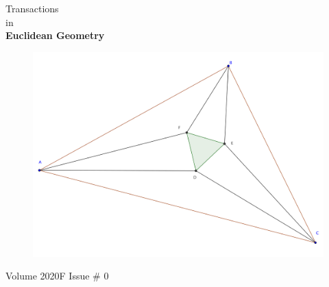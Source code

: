 \documentclass{report}
\begin{document}
\thispagestyle{empty}
\begin{center}
{\Huge Transactions\\ in\\[.2in] \textbf{Euclidean Geometry}}
\vspace{1in}

\begin{figure}[h!]
\includegraphics[width=1.1\textwidth]{cover-image.png}
\end{figure}

\vspace{1in}

{\Huge Volume 2020F Issue \# 0}
\end{center}

\clearpage
\end{document}
